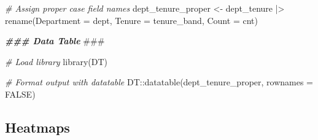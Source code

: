 \documentclass[
]{book}
\newenvironment{Shaded}{\begin{snugshade}}{\end{snugshade}}
\newcommand{\AlertTok}[1]{\textcolor[rgb]{0.94,0.16,0.16}{#1}}
\newcommand{\AttributeTok}[1]{\textcolor[rgb]{0.77,0.63,0.00}{#1}}
\newcommand{\CommentTok}[1]{\textcolor[rgb]{0.56,0.35,0.01}{\textit{#1}}}
\newcommand{\ConstantTok}[1]{\textcolor[rgb]{0.00,0.00,0.00}{#1}}
\newcommand{\DocumentationTok}[1]{\textcolor[rgb]{0.56,0.35,0.01}{\textbf{\textit{#1}}}}
\newcommand{\FunctionTok}[1]{\textcolor[rgb]{0.00,0.00,0.00}{#1}}
\newcommand{\NormalTok}[1]{#1}
\newcommand{\OtherTok}[1]{\textcolor[rgb]{0.56,0.35,0.01}{#1}}
\newcommand{\SpecialCharTok}[1]{\textcolor[rgb]{0.00,0.00,0.00}{#1}}
\newcommand{\StringTok}[1]{\textcolor[rgb]{0.31,0.60,0.02}{#1}}
\begin{document}
\begin{Shaded}
\begin{Highlighting}[]
\CommentTok{\# Assign proper case field names}
\NormalTok{dept\_tenure\_proper }\OtherTok{\textless{}{-}}\NormalTok{ dept\_tenure }\SpecialCharTok{|\textgreater{}}
                      \FunctionTok{rename}\NormalTok{(}\StringTok{\textquotesingle{}Department\textquotesingle{}} \OtherTok{=}\NormalTok{ dept,}
                             \StringTok{\textquotesingle{}Tenure\textquotesingle{}} \OtherTok{=}\NormalTok{ tenure\_band,}
                             \StringTok{\textquotesingle{}Count\textquotesingle{}} \OtherTok{=}\NormalTok{ cnt)}
\end{Highlighting}
\end{Shaded}

\begin{Shaded}
\begin{Highlighting}[]
\DocumentationTok{\#\#\# Data Table }\AlertTok{\#\#\#}

\CommentTok{\# Load library}
\FunctionTok{library}\NormalTok{(DT)}

\CommentTok{\# Format output with datatable}
\NormalTok{DT}\SpecialCharTok{::}\FunctionTok{datatable}\NormalTok{(dept\_tenure\_proper, }\AttributeTok{rownames =} \ConstantTok{FALSE}\NormalTok{)}
\end{Highlighting}
\end{Shaded}

\hypertarget{heatmaps-1}{%
\subsection{Heatmaps}\label{heatmaps-1}}
\end{document}
